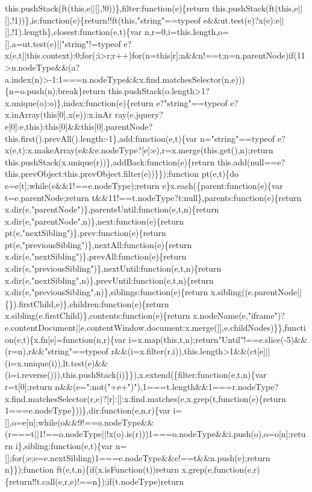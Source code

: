 \begin{DoxyCode}
{       this.pushStack(ft(this,e||[],!0))\},filter:function(e)\{return
       this.pushStack(ft(this,e||[],!1))\},is:function(e)\{return!!ft(this,"string"==typeof e&&ut.test(e)?x(e):e||[],!1).length\},closest:function(e,t)\{var
       n,r=0,i=this.length,o=[],a=ut.test(e)||"string"!=typeof
       e?x(e,t||this.context):0;for(;i>r;r++)for(n=this[r];n&&n!==t;n=n.parentNode)if(11>n.nodeType&&(a?a.index(n)>-1:1===n.nodeType&&x.find.matchesSelector(n,e)))\{n=o.push(n);break\}return
       this.pushStack(o.length>1?x.unique(o):o)\},index:function(e)\{return e?"string"==typeof
       e?x.inArray(this[0],x(e)):x.inAr
      ray(e.jquery?e[0]:e,this):this[0]&&this[0].parentNode?this.first().prevAll().length:-1\},add:function(e,t)\{var n="string"==typeof e?x(e,t):x.makeArray(e&&e.nodeType?[e]:e),r=x.merge(this.get(),n);return
       this.pushStack(x.unique(r))\},addBack:function(e)\{return
       this.add(null==e?this.prevObject:this.prevObject.filter(e))\}\});function pt(e,t)\{do e=e[t];while(e&&1!==e.nodeType);return e\}x.each(\{parent:function(e)\{var
       t=e.parentNode;return t&&11!==t.nodeType?t:null\},parents:function(e)\{return
       x.dir(e,"parentNode")\},parentsUntil:function(e,t,n)\{return x.dir(e,"parentNode",n)\},next:function(e)\{return pt(e,"nextSibling")\},prev:function(e)\{return
       pt(e,"previousSibling")\},nextAll:function(e)\{return x.dir(e,"nextSibling")\},prevAll:function(e)\{return
       x.dir(e,"previousSibling")\},nextUntil:function(e,t,n)\{return
       x.dir(e,"nextSibling",n)\},prevUntil:function(e,t,n)\{return x.dir(e,"previousSibling",n)\},siblings:function(e)\{return
       x.sibling((e.parentNode||\{\}).firstChild,e)\},children:function(e)\{return x.sibling(e.firstChild)\},contents:function(e)\{return
       x.nodeName(e,"iframe")?e.contentDocument||e.contentWindow.document:x.merge([],e.childNodes)\}\},function(e,t)\{x.fn[e]=function(n,r)\{var
       i=x.map(this,t,n);return"Until"!==e.slice(-5)&&(r=n),r&&"string"==typeof
       r&&(i=x.filter(r,i)),this.length>1&&(ct[e]||(i=x.unique(i)),lt.test(e)&&(i=i.reverse())),this.pushStack(i)\}\}),x.extend(\{filter:function(e,t,n)\{var
       r=t[0];return
       n&&(e=":not("+e+")"),1===t.length&&1===r.nodeType?x.find.matchesSelector(r,e)?[r]:[]:x.find.matches(e,x.grep(t,function(e)\{return 1===e.nodeType\}))\},dir:function(e,n,r)\{var
       i=[],o=e[n];while(o&&9!==o.nodeType&&(r===t||1!==o.nodeType||!x(o).is(r)))1===o.nodeType&&i.push(o),o=o[n];return
       i\},sibling:function(e,t)\{var n=[];for(;e;e=e.nextSibling)1===e.nodeType&&e!==t&&n.push(e);return n\}\});function
       ft(e,t,n)\{if(x.isFunction(t))return x.grep(e,function(e,r)\{return!!t.call(e,r,e)!==n\});if(t.nodeType)return
}
\end{DoxyCode}
